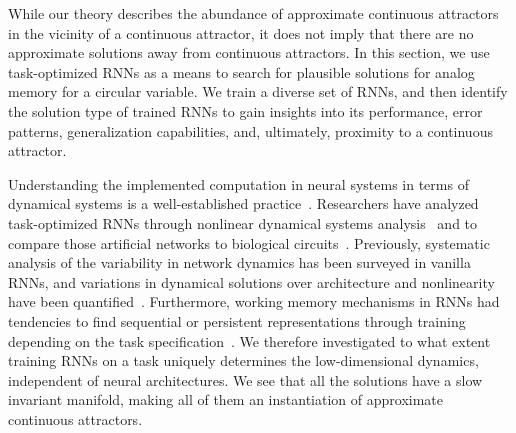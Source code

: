 \documentclass{article} %
\newcounter{ct}
\theoremstyle{definition}
\theoremstyle{remark}
\begin{document}
While our theory describes the abundance of approximate continuous attractors in the vicinity of a continuous attractor, it does not imply that there are no approximate solutions away from continuous attractors.
In this section, we use task-optimized RNNs as a means to search for plausible solutions for analog memory for a circular variable.
We train a diverse set of RNNs, and then identify the solution type of trained RNNs to gain insights into its performance, error patterns, generalization capabilities, and, ultimately, proximity to a continuous attractor.

Understanding the implemented computation in neural systems in terms of dynamical systems is a well-established practice~\citep{seung1996,sompolinsky1988,vyas2020}.
Researchers have analyzed task-optimized RNNs through nonlinear dynamical systems analysis~\citep{sussillo2013blackbox,sussillo2014,barak2013,driscoll2022,maheswaranathan2019universality,cueva2019headdirection,cueva2021continuous,maheswaranathan2019reverse,beer2018laformation,ribeiro2020beyond} and to compare those artificial networks to biological circuits~\citep{mante2013context,remington2018flexible,ghazizadeh2021slow}.
Previously, systematic analysis of the variability in network dynamics has been surveyed in vanilla RNNs, and variations in dynamical solutions over architecture and nonlinearity have been quantified~\citep{sussillo2013blackbox,mante2013context,yang2019task,maheswaranathan2019universality,driscoll2022}.
Furthermore, working memory mechanisms in RNNs had tendencies to find sequential or persistent representations through training depending on the task specification~\citep{orhan2019diverse}.
We therefore investigated to what extent training RNNs on a task uniquely determines the low-dimensional dynamics, independent of neural architectures.
We see that all the solutions have a slow invariant manifold, making all of them an instantiation of approximate continuous attractors.
\end{document}

